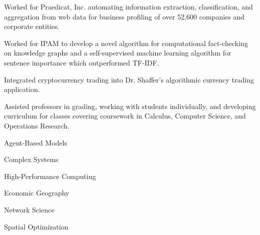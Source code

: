 \documentclass{acmresume}
\begin{document}
        \begin{titemize}
            \item{Worked for Praedicat, Inc. automating information extraction, classification, and aggregation from web data for business profiling of over 52,600 companies and corporate entities.}
            \item{Worked for IPAM to develop a novel algorithm for computational fact-checking on knowledge graphs and a self-supervised machine learning algorithm for sentence importance which outperformed TF-IDF.}
        \end{titemize}

        \begin{titemize}
            \item Integrated cryptocurrency trading into Dr. Shaffer's algorithmic currency trading application.
        \end{titemize}
    
    
    \begin{titemize}
        \item Assisted professors in grading, working with students individually, and developing curriculum for classes covering coursework in Calculus, Computer Science, and Operations Research.
    \end{titemize}


		\begingroup
		\renewcommand{\section}[2]{}
		
		\nocite{*} 
		{}
		\endgroup
        
        \pagebreak
        
        
        \begin{multicols}{3}
            \begin{titemize}
                \item Agent-Based Models
                \item Complex Systems
                \item High-Performance Computing
                \item Economic Geography
                \item Network Science
                \item Spatial Optimization
            \end{titemize}
        \end{multicols}
	
\end{document}
